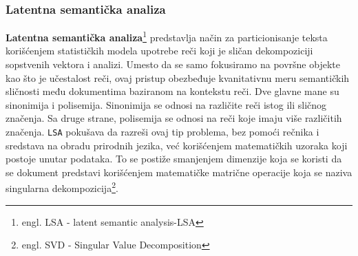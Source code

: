 \documentclass[a4paper]{article}
\begin{document}
\subsubsection{Latentna semantička analiza}
\textbf{Latentna semantička analiza}\footnote{engl. LSA - latent semantic analysis-LSA} predstavlja način za particionisanje teksta korišćenjem statističkih modela upotrebe reči koji je sličan dekompoziciji sopstvenih vektora i analizi. Umesto da se samo fokusiramo na površne objekte kao što je učestalost reči, ovaj pristup obezbeđuje kvanitativnu meru semantičkih sličnosti među dokumentima baziranom na kontekstu reči. Dve glavne mane su sinonimija i polisemija. Sinonimija se odnosi na različite reči istog ili sličnog značenja. Sa druge strane, polisemija se odnosi na reči koje imaju više različitih značenja. \texttt{LSA} pokušava da razreši ovaj tip problema, bez pomoći rečnika i sredstava na obradu prirodnih jezika, već korišćenjem matematičkih uzoraka koji postoje unutar podataka. To se postiže smanjenjem dimenzije koja se koristi da se dokument predstavi korišćenjem matematičke matrične operacije koja se naziva singularna dekompozicija\footnote{engl. SVD - Singular Value Decomposition}.\\
\end{document}
